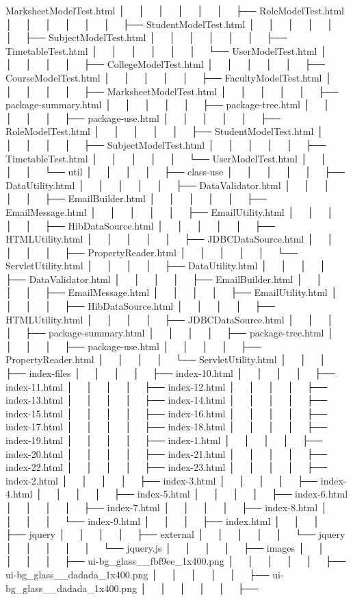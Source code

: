Marksheet\+Model\+Test.\+html │   │   │   │   │   │   ├── Role\+Model\+Test.\+html │   │   │   │   │   │   ├── Student\+Model\+Test.\+html │   │   │   │   │   │   ├── Subject\+Model\+Test.\+html │   │   │   │   │   │   ├── Timetable\+Test.\+html │   │   │   │   │   │   └── User\+Model\+Test.\+html │   │   │   │   │   ├── College\+Model\+Test.\+html │   │   │   │   │   ├── Course\+Model\+Test.\+html │   │   │   │   │   ├── Faculty\+Model\+Test.\+html │   │   │   │   │   ├── Marksheet\+Model\+Test.\+html │   │   │   │   │   ├── package-\/summary.\+html │   │   │   │   │   ├── package-\/tree.\+html │   │   │   │   │   ├── package-\/use.\+html │   │   │   │   │   ├── Role\+Model\+Test.\+html │   │   │   │   │   ├── Student\+Model\+Test.\+html │   │   │   │   │   ├── Subject\+Model\+Test.\+html │   │   │   │   │   ├── Timetable\+Test.\+html │   │   │   │   │   └── User\+Model\+Test.\+html │   │   │   │   └── util │   │   │   │   ├── class-\/use │   │   │   │   │   ├── Data\+Utility.\+html │   │   │   │   │   ├── Data\+Validator.\+html │   │   │   │   │   ├── Email\+Builder.\+html │   │   │   │   │   ├── Email\+Message.\+html │   │   │   │   │   ├── Email\+Utility.\+html │   │   │   │   │   ├── Hib\+Data\+Source.\+html │   │   │   │   │   ├── HTMLUtility.\+html │   │   │   │   │   ├── JDBCData\+Source.\+html │   │   │   │   │   ├── Property\+Reader.\+html │   │   │   │   │   └── Servlet\+Utility.\+html │   │   │   │   ├── Data\+Utility.\+html │   │   │   │   ├── Data\+Validator.\+html │   │   │   │   ├── Email\+Builder.\+html │   │   │   │   ├── Email\+Message.\+html │   │   │   │   ├── Email\+Utility.\+html │   │   │   │   ├── Hib\+Data\+Source.\+html │   │   │   │   ├── HTMLUtility.\+html │   │   │   │   ├── JDBCData\+Source.\+html │   │   │   │   ├── package-\/summary.\+html │   │   │   │   ├── package-\/tree.\+html │   │   │   │   ├── package-\/use.\+html │   │   │   │   ├── Property\+Reader.\+html │   │   │   │   └── Servlet\+Utility.\+html │   │   │   ├── index-\/files │   │   │   │   ├── index-\/10.\+html │   │   │   │   ├── index-\/11.\+html │   │   │   │   ├── index-\/12.\+html │   │   │   │   ├── index-\/13.\+html │   │   │   │   ├── index-\/14.\+html │   │   │   │   ├── index-\/15.\+html │   │   │   │   ├── index-\/16.\+html │   │   │   │   ├── index-\/17.\+html │   │   │   │   ├── index-\/18.\+html │   │   │   │   ├── index-\/19.\+html │   │   │   │   ├── index-\/1.\+html │   │   │   │   ├── index-\/20.\+html │   │   │   │   ├── index-\/21.\+html │   │   │   │   ├── index-\/22.\+html │   │   │   │   ├── index-\/23.\+html │   │   │   │   ├── index-\/2.\+html │   │   │   │   ├── index-\/3.\+html │   │   │   │   ├── index-\/4.\+html │   │   │   │   ├── index-\/5.\+html │   │   │   │   ├── index-\/6.\+html │   │   │   │   ├── index-\/7.\+html │   │   │   │   ├── index-\/8.\+html │   │   │   │   └── index-\/9.\+html │   │   │   ├── index.\+html │   │   │   ├── jquery │   │   │   │   ├── external │   │   │   │   │   └── jquery │   │   │   │   │   └── jquery.\+js │   │   │   │   ├── images │   │   │   │   │   ├── ui-\/bg\+\_\+glass\+\_\+\_\+fbf9ee\+\_\+1x400.\+png │   │   │   │   │   ├── ui-\/bg\+\_\+glass\+\_\+\_\+dadada\+\_\+1x400.\+png │   │   │   │   │   ├── ui-\/bg\+\_\+glass\+\_\+\_\+dadada\+\_\+1x400.\+png │   │   │   │   │   ├── 